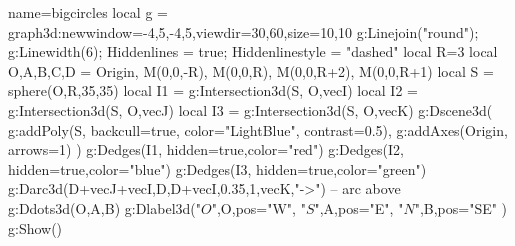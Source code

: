 \documentclass[12pt]{standalone}
\begin{document}
\begin{luadraw}{name=bigcircles}
local g = graph3d:new{window={-4,5,-4,5},viewdir={30,60},size={10,10}}
g:Linejoin("round"); g:Linewidth(6); Hiddenlines = true; Hiddenlinestyle = "dashed"
local R=3
local O,A,B,C,D = Origin, M(0,0,-R), M(0,0,R), M(0,0,R+2), M(0,0,R+1)
local S = sphere(O,R,35,35) 
local I1 = g:Intersection3d(S, {O,vecI}) 
local I2 = g:Intersection3d(S, {O,vecJ})
local I3 = g:Intersection3d(S, {O,vecK})
g:Dscene3d(
    g:addPoly(S, {backcull=true, color="LightBlue", contrast=0.5}),
    g:addAxes(Origin, {arrows=1})
    )
g:Dedges(I1, {hidden=true,color="red"})
g:Dedges(I2, {hidden=true,color="blue"})
g:Dedges(I3, {hidden=true,color="green"})
g:Darc3d(D+vecJ+vecI,D,D+vecI,0.35,1,vecK,"->") -- arc above
g:Ddots3d({O,A,B})
g:Dlabel3d("$O$",O,{pos="W"},  "$S$",A,{pos="E"}, "$N$",B,{pos="SE"} )
g:Show()
\end{luadraw}
\end{document}
